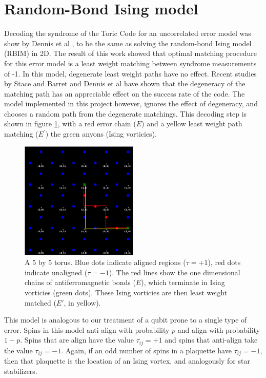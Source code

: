 \section{Random-Bond Ising model}
	Decoding the syndrome of the Toric Code for an uncorrelated error model was show by Dennis et al \cite{Dennis2001}, to be the same as solving the random-bond Ising model (RBIM) in 2D. The result of this work showed that optimal matching procedure for this error model is a least weight matching between syndrome measurements of -1. In this model, degenerate least weight paths have no effect. Recent studies by Stace and Barret \cite{Stace2010} and Dennis et al\cite{Dennis2001} have shown that the degeneracy of the matching path has an appreciable effect on the success rate of the code. The model implemented in this project however, ignores the effect of degeneracy, and chooses a random path from the degenerate matchings. This decoding step is shown in figure \ref{fig:graphicaloutput}, with a red error chain ($E$) and a yellow least weight path matching ($E^\prime$) the green anyons (Ising vorticies).
	
	\begin{figure}[htpb]
	\centering
	\includegraphics[width=0.5\textwidth ]{figs/graphicaloutput.png}
	\caption{A 5 by 5 torus. Blue dots indicate aligned regions ($\tau = +1$), red dots indicate unaligned ($\tau = -1$). The red lines show the one dimensional chains of antiferromagnetic bonds ($E$), which terminate in Ising vorticies (green dots). These Ising vorticies are then least weight matched ($E'$, in yellow).}
	\label{fig:graphicaloutput}
	\end{figure}
	
	This model is analogous to our treatment of a qubit prone to a single type of error. Spins in this model anti-align with probability $p$ and align with probability $1-p$. Spins that are align have the value $\tau_{ij}=+1$ and spins that anti-align take the value $\tau_{ij}=-1$. Again, if an odd number of spins in a plaquette have $\tau_{ij}= -1$, then that plaquette is the location of an Ising vortex, and analogously for star stabilizers.
	
